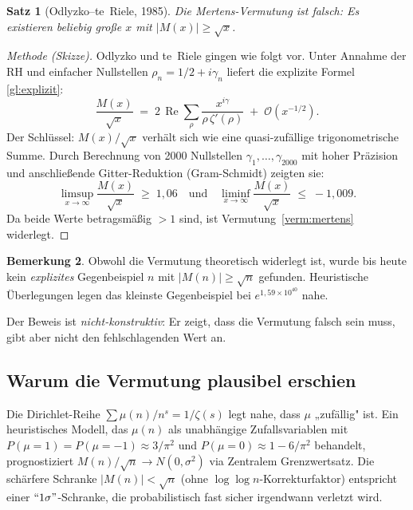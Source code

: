 \documentclass[12pt,a4paper]{amsart}
\newtheorem{theorem}{Satz}[section]
\theoremstyle{definition}
\newtheorem{bemerkung}[theorem]{Bemerkung}
\newcommand{\BigO}{\mathcal{O}}
\begin{document}
\begin{theorem}[Odlyzko--te~Riele, 1985]
\label{satz:odlyzko}
Die Mertens-Vermutung ist \emph{falsch}: Es existieren beliebig große $x$ mit
$|M(x)| \ge \sqrt{x}$.
\end{theorem}

\begin{proof}[Methode (Skizze)]
Odlyzko und te~Riele \cite{OdlyzkoTeRiele1985} gingen wie folgt vor.
Unter Annahme der RH und einfacher Nullstellen
$\rho_n = 1/2 + i\gamma_n$ liefert die explizite Formel \eqref{gl:explizit}:
\[
  \frac{M(x)}{\sqrt{x}} \;=\;
  2\,\operatorname{Re}\sum_{\rho} \frac{x^{i\gamma}}{\rho\,\zeta'(\rho)}
  \;+\; \BigO(x^{-1/2}).
\]
Der Schlüssel: $M(x)/\sqrt{x}$ verhält sich wie eine quasi-zufällige
trigonometrische Summe.  Durch Berechnung von 2000 Nullstellen
$\gamma_1,\ldots,\gamma_{2000}$ mit hoher Präzision und anschließende
Gitter-Reduktion (Gram-Schmidt) zeigten sie:
\[
  \limsup_{x\to\infty}\frac{M(x)}{\sqrt{x}} \;\ge\; 1{,}06
  \quad\text{und}\quad
  \liminf_{x\to\infty}\frac{M(x)}{\sqrt{x}} \;\le\; -1{,}009.
\]
Da beide Werte betragsmäßig $> 1$ sind, ist Vermutung~\ref{verm:mertens}
widerlegt.
\end{proof}

\begin{bemerkung}
\label{bem:gegenbeispiel}
Obwohl die Vermutung theoretisch widerlegt ist, wurde bis heute kein
\emph{explizites} Gegenbeispiel $n$ mit $|M(n)| \ge \sqrt{n}$ gefunden.
Heuristische Überlegungen legen das kleinste Gegenbeispiel bei
$e^{1{,}59 \times 10^{40}}$ nahe.

Der Beweis ist \emph{nicht-konstruktiv}: Er zeigt, dass die Vermutung falsch
sein muss, gibt aber nicht den fehlschlagenden Wert an.
\end{bemerkung}

\subsection{Warum die Vermutung plausibel erschien}

Die Dirichlet-Reihe $\sum \mu(n)/n^s = 1/\zeta(s)$ legt nahe, dass $\mu$
„zufällig" ist.  Ein heuristisches Modell, das $\mu(n)$ als unabhängige
Zufallsvariablen mit $P(\mu=1) = P(\mu=-1) \approx 3/\pi^2$ und
$P(\mu=0) \approx 1 - 6/\pi^2$ behandelt, prognostiziert
$M(n)/\sqrt{n} \to N(0,\sigma^2)$ via Zentralem Grenzwertsatz.  Die schärfere
Schranke $|M(n)| < \sqrt{n}$ (ohne $\log\log n$-Korrekturfaktor) entspricht
einer $``1\sigma"$-Schranke, die probabilistisch fast sicher irgendwann verletzt
wird.
\end{document}
